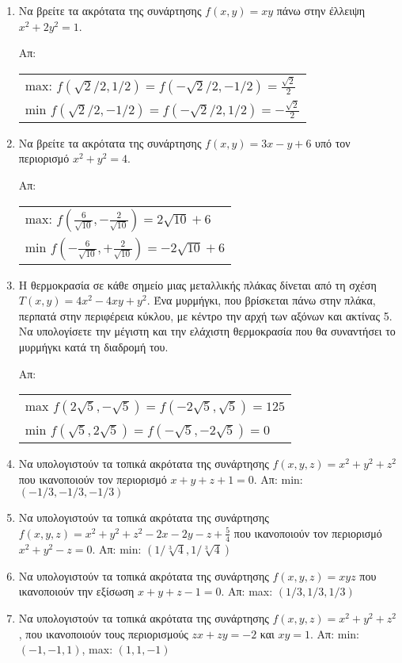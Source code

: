 \begin{enumerate}

  \item Να βρείτε τα ακρότατα της συνάρτησης $ f(x,y) = xy $ πάνω στην έλλειψη 
    $ x^{2}+2y^{2}=1 $.

    \hfill Απ: 
    \begin{tabular}{l}
      max: $ f(\sqrt{2} /2, 1/2) = f(- \sqrt{2} /2, -1/2) = \frac{\sqrt{2}}{2} $ \\
      min $ f(\sqrt{2} /2, -1/2) = f(- \sqrt{2} /2, 1/2) = -\frac{\sqrt{2}}{2} $ \\
    \end{tabular}

  \item Να βρείτε τα ακρότατα της συνάρτησης $ f(x,y) = 3x-y+6 $ υπό τον περιορισμό 
    $ x^{2}+y^{2}=4 $.

    \hfill Απ:  
    \begin{tabular}{l}
      max: $ f(\frac{6}{\sqrt{10}} , - \frac{2}{\sqrt{10}}) = 2 \sqrt{10} +6 $ \\
      min $ f(-\frac{6}{\sqrt{10}} , + \frac{2}{\sqrt{10}}) = -2 \sqrt{10} +6 $ \\
    \end{tabular}

  \item Η θερμοκρασία σε κάθε σημείο μιας μεταλλικής πλάκας δίνεται από τη σχέση
    $ T(x,y) = 4x^{2}-4xy+y^2 $.
    Ένα μυρμήγκι, που βρίσκεται πάνω στην πλάκα, περπατά στην περιφέρεια κύκλου, 
    με κέντρο την αρχή των αξόνων και ακτίνας 5. Να υπολογίσετε την μέγιστη και την 
    ελάχιστη θερμοκρασία που θα συναντήσει το μυρμήγκι κατά τη διαδρομή του.

    \hfill Απ:  
    \begin{tabular}{l}
      max $ f(2 \sqrt{5} , - \sqrt{5}) = f(-2 \sqrt{5} , \sqrt{5}) = 125 $ \\
      min $ f(\sqrt{5} , 2 \sqrt{5}) = f(- \sqrt{5} , - 2 \sqrt{5}) = 0 $ 
    \end{tabular}

  \item Να υπολογιστούν τα τοπικά ακρότατα της συνάρτησης $ f(x,y,z) = x^{2}+y^{2}+z^{2}
    $ που ικανοποιούν τον περιορισμό $ x+y+z+1=0 $.
    \hfill Απ: min: $ (-1/3,-1/3,-1/3) $ 

  \item Να υπολογιστούν τα τοπικά ακρότατα της συνάρτησης 
    $ f(x,y,z) = x^{2}+y^{2}+z^{2}-2x-2y-z+ \frac{5}{4} $ που ικανοποιούν τον 
    περιορισμό $ x^{2}+y^{2}-z=0  $.
    \hfill Απ: min: $ (1/ \sqrt[3]{4} , 1/ \sqrt[3]{4}) $ 

  \item Να υπολογιστούν τα τοπικά ακρότατα της συνάρτησης 
    $f(x,y,z)=xyz$ που ικανοποιούν την εξίσωση $x+y+z-1=0$.  
    \hfill Απ: max: $ (1/3,1/3,1/3) $ 

  \item Να υπολογιστούν τα τοπικά ακρότατα της συνάρτησης 
    $ f(x,y,z) = x^{2}+y^{2}+z^{2} $, που ικανοποιούν τους περιορισμούς 
    $ zx+zy=-2 $ και $ xy=1 $.
    \hfill Απ: min: $ (-1,-1,1) $, max: $ (1,1,-1) $ 
\end{enumerate}



